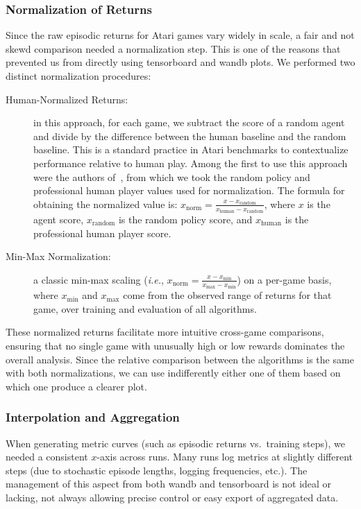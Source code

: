 \subsubsection{Normalization of Returns}
\label{subsubsec:normalization}
Since the raw episodic returns for Atari games vary widely in scale, a fair and not skewd comparison needed a normalization step. This is one of the reasons that prevented us from directly using tensorboard and wandb plots. We performed two distinct normalization procedures:
\begin{description}
	\item[Human-Normalized Returns:] in this approach, for each game, we subtract the score of a random agent and divide by the difference between the human baseline and the random baseline. This is a standard practice in Atari benchmarks to contextualize performance relative to human play. Among the first to use this approach were the authors of~\cite{mnih:human}, from which we took the random policy and professional human player values used for normalization. The formula for obtaining the normalized value is: $x_{\text{norm}} = \frac{x - x_\text{random}}{x_\text{human} - x_\text{random}}$, where $x$ is the agent score, $x_\text{random}$ is the random policy score, and $x_\text{human}$ is the professional human player score.
	\item[Min-Max Normalization:] a classic min-max scaling (\emph{i.e.}, $x_{\text{norm}} = \frac{x - x_{\min}}{x_{\max} - x_{\min}}$) on a per-game basis, where $x_{\min}$ and $x_{\max}$ come from the observed range of returns for that game, over training and evaluation of all algorithms.
\end{description}
These normalized returns facilitate more intuitive cross-game comparisons, ensuring that no single game with unusually high or low rewards dominates the overall analysis. Since the relative comparison between the algorithms is the same with both normalizations, we can use indifferently either one of them based on which one produce a clearer plot.

\subsubsection{Interpolation and Aggregation}
When generating metric curves (such as episodic returns vs.\ training steps), we needed a consistent $x$-axis across runs. Many runs log metrics at slightly different steps (due to stochastic episode lengths, logging frequencies, etc.). The management of this aspect from both wandb and tensorboard is not ideal or lacking, not always allowing precise control or easy export of aggregated data.

